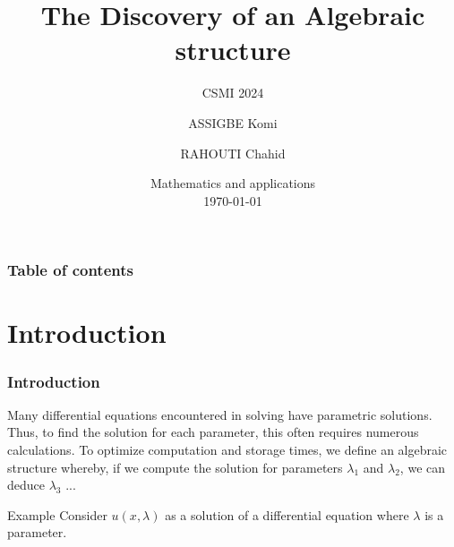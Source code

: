 \documentclass{beamer}
\title{The Discovery of an  Algebraic structure}
\subtitle{CSMI 2024}
\author[ASSIGBE Komi. RAHOUTI Chahid.]{ASSIGBE Komi \and  RAHOUTI Chahid}
\institute[]{University of Strasbourg \\ \smallskip}
\date[\today]{Mathematics and applications \\ \today}
\begin{document}
    \begin{frame}
        \titlepage%
    \end{frame}


    \begin{frame}
        \frametitle{Table of contents}
        \tableofcontents
    \end{frame}

    \section{Introduction}
    \begin{frame}
        \frametitle{Introduction}
        Many differential equations encountered 
        in solving have parametric solutions.
        Thus, to find the solution for each 
        parameter, this often requires 
        numerous calculations. To optimize 
        computation and storage times, we 
        define an algebraic structure 
        whereby, if we compute the solution 
        for parameters $\lambda_1$ and $ \lambda_2 $,
        we can deduce $\lambda_3$ ...
    \end{frame}
    \begin{frame}{Example}
        Consider $u(x,\lambda)$ as a solution
        of a differential equation
        where $\lambda$ is a parameter. \\
    \end{frame}
        
\end{document}
